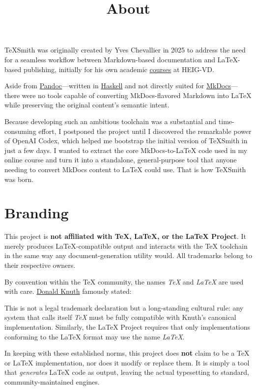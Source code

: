 \documentclass[a4paper,twoside]{article}
\title{About}
\author{}\date{}
\begin{document}
\maketitle
TeXSmith was originally created by Yves Chevallier in 2025 to address the need for a seamless workflow between Markdown-based documentation and \LaTeX{}-based publishing, initially for his own academic \href{https://heig-tin-info.github.io/handbook/}{courses} at HEIG-VD.

Aside from \href{https://pandoc.org/}{Pandoc}---written in \href{https://en.wikipedia.org/wiki/Haskell}{Haskell} and not directly suited for \href{https://www.mkdocs.org/}{MkDocs}---there were no tools capable of converting MkDocs-flavored Markdown into \LaTeX{} while preserving the original content's semantic intent.

Because developing such an ambitious toolchain was a substantial and time-consuming effort, I postponed the project until I discovered the remarkable power of OpenAI Codex, which helped me bootstrap the initial version of TeXSmith in just a few days. I wanted to extract the core MkDocs-to-\LaTeX{} code used in my online course and turn it into a standalone, general-purpose tool that anyone needing to convert MkDocs content to \LaTeX{} could use. That is how TeXSmith was born.
\section{Branding}
This project is \textbf{not affiliated with \TeX{}, \LaTeX{}, or the \LaTeX{} Project}. It merely produces \LaTeX{}-compatible output and interacts with the \TeX{} toolchain in the same way any document-generation utility would. All trademarks belong to their respective owners.

By convention within the \TeX{} community, the names \emph{\TeX{}} and \emph{\LaTeX{}} are used with care. \href{https://en.wikipedia.org/wiki/Donald\_Knuth}{Donald Knuth} famously stated:
\begin{displayquote}
\end{displayquote}
This is not a legal trademark declaration but a long-standing cultural rule: any system that calls itself \emph{\TeX{}} must be fully compatible with Knuth's canonical implementation. Similarly, the \LaTeX{} Project requires that only implementations conforming to the \LaTeX{} format may use the name \emph{\LaTeX{}}.

In keeping with these established norms, this project does \textbf{not} claim to be a \TeX{} or \LaTeX{} implementation, nor does it modify or replace them. It is simply a tool that \emph{generates} \LaTeX{} code as output, leaving the actual typesetting to standard, community-maintained engines.
\end{document}
